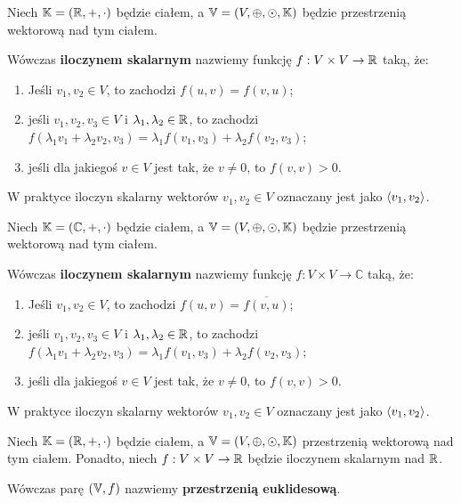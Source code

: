 \begin{definition}
Niech \(\mathbb{K} = (\mathbb{R}, +, \cdot)\) będzie ciałem, a \(\mathbb{V} = (V, \oplus, \odot, \mathbb{K})\) będzie przestrzenią wektorową nad tym ciałem. 

Wówczas \textbf{iloczynem skalarnym} nazwiemy funkcję \(f: V \times V \rightarrow \mathbb{R}\) taką, że:

\begin{enumerate}
    \item Jeśli \(v_1, v_2 \in V\), to zachodzi \(f(u,v) = f(v,u)\);
    \item jeśli \(v_1, v_2, v_3 \in V\) i \(\lambda_1, \lambda_2 \in \mathbb{R}\), to zachodzi \(f(\lambda_1 v_1 + \lambda_2 v_2, v_3) = \lambda_1 f(v_1, v_3) + \lambda_2 f(v_2, v_3) \);
    \item jeśli dla jakiegoś \(v \in V\) jest tak, że \(v \not = 0\), to \(f(v,v) > 0\). 
\end{enumerate}

W praktyce iloczyn skalarny wektorów \(v_1, v_2 \in V\) oznaczany jest jako \(\langle v_1, v_2 \rangle\). 
\end{definition}

\begin{definition}
Niech \(\mathbb{K} = (\mathbb{C}, +, \cdot)\) będzie ciałem, a \(\mathbb{V} = (V, \oplus, \odot, \mathbb{K})\) będzie przestrzenią wektorową nad tym ciałem. 

Wówczas \textbf{iloczynem skalarnym} nazwiemy funkcję \(f: V \times V \rightarrow \mathbb{C}\) taką, że:

\begin{enumerate}
    \item Jeśli \(v_1, v_2 \in V\), to zachodzi \(f(u,v) = \overline{f(v,u)}\);
    \item jeśli \(v_1, v_2, v_3 \in V\) i \(\lambda_1, \lambda_2 \in \mathbb{R}\), to zachodzi \(f(\lambda_1 v_1 + \lambda_2 v_2, v_3) = \lambda_1 f(v_1, v_3) + \lambda_2 f(v_2, v_3) \);
    \item jeśli dla jakiegoś \(v \in V\) jest tak, że \(v \not = 0\), to \(f(v,v) > 0\). 
\end{enumerate}

W praktyce iloczyn skalarny wektorów \(v_1, v_2 \in V\) oznaczany jest jako \(\langle v_1, v_2 \rangle\). 
\end{definition}

\begin{definition}
Niech \(\mathbb{K} = (\mathbb{R}, +, \cdot)\) będzie ciałem, a \(\mathbb{V} = (V, \oplus, \odot, \mathbb{K})\) przestrzenią wektorową nad tym ciałem. Ponadto, niech \(f: V \times V \rightarrow \mathbb{R}\) będzie iloczynem skalarnym nad \(\mathbb{R}\).

Wówczas parę \((\mathbb{V}, f)\) nazwiemy \textbf{przestrzenią euklidesową}.
\end{definition}

